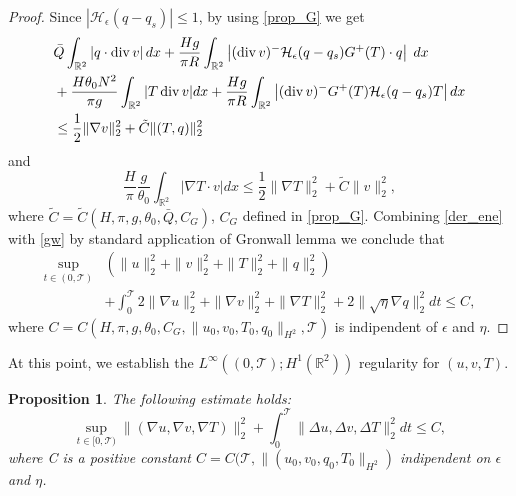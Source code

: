 \documentclass[11pt, a4paper, article,reqno,]{amsart}
\newtheorem{proposition}[theorem]{Proposition}
\theoremstyle{remark}
\DeclareMathOperator{\dive}{div}
\numberwithin{equation}{section}
\begin{document}
\begin{proof}
Since $\left| \mathcal{H}_\epsilon (q-q_s)\right|\leq 1$, by using \eqref{prop_G} we get
\begin{equation}\label{gw}
    \begin{aligned}
        &\bar{Q} \int_{\mathbb{R}^2} \left| q \cdot \dive v \right| dx +   \frac{Hg}{\pi R} \int_{\mathbb{R}^2} \left| (\dive v)^-\mathcal{H}_{\epsilon}(q-q_s) G^+(T)  \cdot q \right|\; dx \\
        & + \frac{H \theta_0 N^2}{\pi g} \int_{\mathbb{R}^2} |T \dive v| dx+ \frac{Hg}{\pi R}\int_{\mathbb{R}^2} \left|(\dive v)^- G^+(T)\mathcal{H}_\epsilon(q-q_s) T\right| dx \\
        & \leq   \frac{1}{2} \|\nabla v\|_2^2 +  \Tilde{C} \|(T,q)\|_2^2
    \end{aligned}
\end{equation}
and 
\begin{equation}\label{5.7}
    \frac{H}{\pi} \frac{g}{\theta_0} \int_{\mathbb{R}^2} |\nabla T  \cdot v |dx \leq \frac{1}{2} \|\nabla T\|_2^2 + \tilde{C}\|v\|_2^2,
\end{equation}
where $\tilde{C}= \tilde{C}(H, \pi,g,\theta_0, \bar{Q}, C_G)$, $C_G$ defined in \eqref{prop_G}. Combining  \eqref{der_ene} with \eqref{gw} by standard application of Gronwall lemma we conclude that
\begin{equation*}
    \begin{aligned}
        \sup_{t \in (0, \mathcal{T})} & \left(\|u\|_2^2 + \|v\|_2^2 +  \|T\|_2^2 + \|q\|_2^2 \right)  \\
        & + \int_0^{\mathcal{T}} 2\|\nabla u\|_2^2 + \|\nabla v\|_2^2 + \|\nabla T\|_2^2 + 2\|\sqrt{\eta} \nabla q\|_2^2 dt \leq C, 
    \end{aligned}
\end{equation*}
where $C=C(H,\pi,g,\theta_0,C_G, \|u_0,v_0,T_{0},q_0\|_{H^2},\mathcal{T})$ is indipendent of $\epsilon$ and $\eta$. 
\end{proof}
At this point, we establish the $L^{\infty}((0,\mathcal{T}); H^1(\mathbb{R}^2))$ regularity for $(u,v,T)$.





\begin{proposition}\label{prop2}
    The following estimate holds:
    \begin{equation}\label{3ene}
        \sup_{t \in[0,\mathcal{T})} \|(\nabla u, \nabla v, \nabla T)\|_2^2 + \int_0^\mathcal{T}\|\Delta u, \Delta v, \Delta T\|_2^2 dt \leq C,
    \end{equation}
    where C is a positive constant $C= C(\mathcal{T},\|(u_0,v_0,q_0,T_{0}\|_{H^2})$ indipendent on $\epsilon$ and $\eta$. 
\end{proposition}
\end{document}
